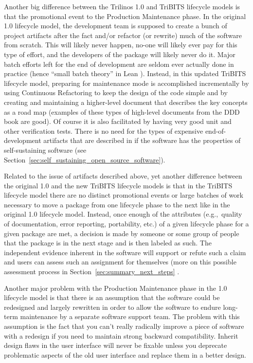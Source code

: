 \documentclass[11pt]{SANDreport}
\begin{document}
Another big difference between the Trilinos 1.0 and TriBITS lifecycle models is that the promotional event to the Production Maintenance phase.  In the original 1.0 lifecycle model, the development team is supposed to create a bunch of project artifacts after the fact and/or refactor (or rewrite) much of the software from scratch.  This will likely never happen, no-one will likely ever pay for this type of effort, and the developers of the package will likely never do it. Major batch efforts left for the end of development are seldom ever actually done in practice (hence ``small batch theory'' in Lean {}\cite{ImplementingLeanSoftwareDevelopment}).  Instead, in this updated TriBITS lifecycle model, preparing for maintenance mode is accomplished incrementally by using Continuous Refactoring to keep the design of the code simple and by creating and maintaining a higher-level document that describes the key concepts as a road map (examples of these types of high-level documents from the DDD book are good).  Of course it is also facilitated by having very good unit and other verification tests.  There is no need for the types of expensive end-of-development artifacts that are described in {}\cite{TrilinosLifecycleModel2007} if the software has the properties of self-sustaining software (see Section~\ref{sec:self_sustaining_open_source_software}).

Related to the issue of artifacts described above, yet another difference between the original 1.0 and the new TriBITS lifecycle models is that in the TriBITS lifecycle model there are no distinct promotional events or large batches of work necessary to move a package from one lifecycle phase to the next like in the original 1.0 lifecycle model.  Instead, once enough of the attributes (e.g.,\ quality of documentation, error reporting, portability, etc.) of a given lifecycle phase for a given package are met, a decision is made by someone or some group of people that the package is in the next stage and is then labeled as such.  The independent evidence inherent in the software will support or refute such a claim and users can assess such an assignment for themselves (more on this possible assessment process in Section~\ref{sec:summary_next_steps} .

Another major problem with the Production Maintenance phase in the 1.0 lifecycle model is that there is an assumption that the software could be redesigned and largely rewritten in order to allow the software to endure long-term maintenance by a separate software support team.  The problem with this assumption is the fact that you can't really radically improve a piece of software with a redesign if you need to maintain strong backward compatibility.  Inherit design flaws in the user interface will never be fixable unless you deprecate problematic aspects of the old user interface and replace them in a better design.
\end{document}

